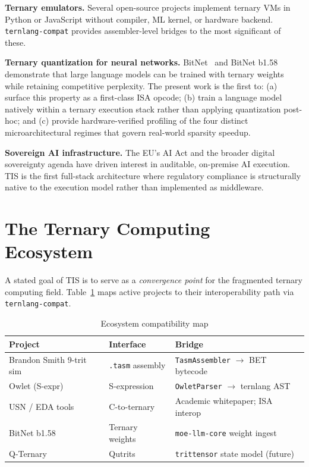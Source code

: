 \documentclass[journal,10pt,twocolumn]{IEEEtran}
\begin{document}
\textbf{Ternary emulators.} Several open-source projects implement ternary
VMs in Python or JavaScript without compiler, ML kernel, or hardware backend.
\texttt{ternlang-compat} provides assembler-level bridges to the most
significant of these.

\textbf{Ternary quantization for neural networks.} BitNet~\cite{ma2024era}
and BitNet b1.58~\cite{ma2024bitnet158} demonstrate that large language
models can be trained with ternary weights while retaining competitive
perplexity. The present work is the first to: (a) surface this property as a
first-class ISA opcode; (b) train a language model natively within a ternary
execution stack rather than applying quantization post-hoc; and (c) provide
hardware-verified profiling of the four distinct microarchitectural regimes
that govern real-world sparsity speedup.

\textbf{Sovereign AI infrastructure.} The EU's AI Act and the broader
digital sovereignty agenda have driven interest in auditable, on-premise AI
execution. TIS is the first full-stack architecture where regulatory
compliance is structurally native to the execution model rather than
implemented as middleware.

\section{The Ternary Computing Ecosystem}
\label{sec:ecosystem}

A stated goal of TIS is to serve as a \emph{convergence point} for the
fragmented ternary computing field. Table~\ref{tab:ecosystem} maps active
projects to their interoperability path via \texttt{ternlang-compat}.

\begin{table}[h]
\centering
\small
\caption{Ecosystem compatibility map}
\label{tab:ecosystem}
\begin{tabular}{p{2.0cm}p{1.8cm}p{3.3cm}}
\toprule
Project & Interface & Bridge \\
\midrule
Brandon Smith 9-trit sim & \texttt{.tasm} assembly & \texttt{TasmAssembler} $\to$ BET bytecode \\
Owlet (S-expr) & S-expression & \texttt{OwletParser} $\to$ ternlang AST \\
USN / EDA tools & C-to-ternary & Academic whitepaper; ISA interop \\
BitNet b1.58 & Ternary weights & \texttt{moe-llm-core} weight ingest \\
Q-Ternary & Qutrits & \texttt{trittensor} state model (future) \\
\bottomrule
\end{tabular}
\end{table}
\end{document}
